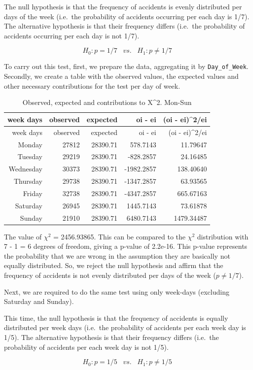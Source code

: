 \documentclass[]{article}
\begin{document}
The null hypothesis is that the frequency of accidents is evenly
distributed per days of the week (i.e.~the probability of accidents
occurring per each day is 1/7). The alternative hypothesis is that their
frequency differs (i.e.~the probability of accidents occurring per each
day is not 1/7).

\[H_{0}: p=1/7\;\;\;vs.\;\;\;H_{1}:p\neq1/7\;\] \pagebreak

To carry out this test, first, we prepare the data, aggregating it by
\texttt{Day\_of\_Week}. Secondly, we create a table with the observed
values, the expected values and other necessary contributions for the
test per day of week.

\begin{longtable}[]{@{}rrrrr@{}}
\caption{Observed, expected and contributions to X\^{}2.
Mon-Sun}\tabularnewline
\toprule
week days & observed & expected & oi - ei & (oi -
ei)\^{}2/ei\tabularnewline
\midrule
\endfirsthead
\toprule
week days & observed & expected & oi - ei & (oi -
ei)\^{}2/ei\tabularnewline
\midrule
\endhead
Monday & 27812 & 28390.71 & 578.7143 & 11.79647\tabularnewline
Tuesday & 29219 & 28390.71 & -828.2857 & 24.16485\tabularnewline
Wednesday & 30373 & 28390.71 & -1982.2857 & 138.40640\tabularnewline
Thursday & 29738 & 28390.71 & -1347.2857 & 63.93565\tabularnewline
Friday & 32738 & 28390.71 & -4347.2857 & 665.67163\tabularnewline
Saturday & 26945 & 28390.71 & 1445.7143 & 73.61878\tabularnewline
Sunday & 21910 & 28390.71 & 6480.7143 & 1479.34487\tabularnewline
\bottomrule
\end{longtable}

The value of \(\chi ^2\) = 2456.93865. This can be compared to the
\(\chi ^2\) distribution with 7 - 1 = 6 degrees of freedom, giving a
p-value of 2.2e-16. This p-value represents the probability that we are
wrong in the assumption they are basically not equally distributed. So,
we reject the null hypothesis and affirm that the frequency of accidents
is not evenly distributed per days of the week (\(p\neq1/7\)).

Next, we are required to do the same test using only week-days
(excluding Saturday and Sunday).

This time, the null hypothesis is that the frequency of accidents is
equally distributed per week days (i.e.~the probability of accidents per
each week day is 1/5). The alternative hypothesis is that their
frequency differs (i.e.~the probability of accidents per each week day
is not 1/5).

\[H_{0}: p=1/5\;\;\;vs.\;\;\;H_{1}:p\neq1/5\;\]
\end{document}
